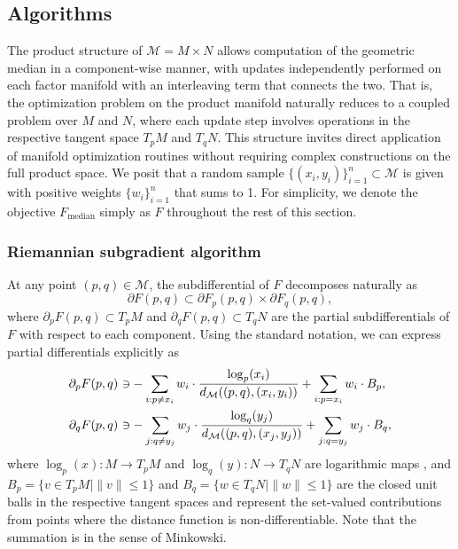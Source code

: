 \documentclass[10pt]{article}
\newcommand{\calM}{\mathcal{M}}
\begin{document}
\subsection{Algorithms}


The product structure of $\calM = M\times N$ allows computation of the geometric median in a component-wise manner, with updates independently performed on each factor manifold with an interleaving term that connects the two. That is, the optimization problem on the product manifold naturally reduces to a coupled problem over $M$ and $N$, where each update step involves operations in the respective tangent space $T_p M$ and $T_q N$. This structure invites direct application of manifold optimization routines without requiring complex constructions on the full product space. We posit that a random sample $\lbrace (x_i,y_i)\rbrace_{i=1}^n \subset \calM$ is given with positive weights $\lbrace w_i\rbrace_{i=1}^n$ that sums to 1. For simplicity, we denote the objective $F_{\text{median}}$ simply as $F$ throughout the rest of this section.

\subsubsection{Riemannian subgradient algorithm}
At any point $(p,q) \in \calM$, the subdifferential of $F$ decomposes naturally as 
\begin{equation*}
\partial F(p,q) \subset \partial F_p (p,q) \times \partial F_q(p,q),
\end{equation*}
where $\partial_p F(p,q) \subset T_p M$ and $\partial_q F(p,q) \subset T_q N$ are the partial subdifferentials of $F$ with respect to each component. Using the standard notation, we can express partial differentials explicitly as 
\begin{align*}
\partial_p F(p,q) &~\reflectbox{$\in$} - \sum_{i: p\neq x_i} w_i \cdot \frac{\log_p (x_i)}{d_\calM ((p,q), (x_i, y_i))} + \sum_{i:p=x_i} w_i \cdot B_p,\\
\partial_q F(p,q) &~\reflectbox{$\in$} - \sum_{j: q\neq y_j} w_j \cdot \frac{\log_q (y_j)}{d_\calM ((p,q), (x_j, y_j))} + \sum_{j:q=y_j} w_j \cdot B_q,
\end{align*}
where $\log_p (x):M\to T_p M$ and $\log_q (y):N\to T_q N$ are logarithmic maps \citep{absil_2008_OptimizationAlgorithmsMatrix}, and $B_p = \lbrace v  \in T_pM \mid \|v\| \leq 1\rbrace$ and 
$B_q = \lbrace w  \in T_q N \mid \|w\| \leq 1\rbrace$ are the closed unit balls in the respective tangent spaces and  represent  the set-valued contributions from points where the distance function is non-differentiable. Note that the summation is in the sense of Minkowski.
\end{document}
